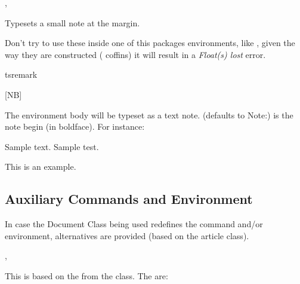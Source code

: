 \documentclass{article}
\begin{document}
\begin{codedescribe}[code]{\typesetmarginnote,\tsmarginnote}
\begin{codesyntax}
\end{codesyntax}
Typesets a small note at the margin. 
\end{codedescribe}

\begin{tsremark}
  Don't try to use these inside one of this packages environments, like , given the way they are constructed ( coffins) it will result in a \emph{Float(s) lost} error.
\end{tsremark}

\begin{codedescribe}[env]{tsremark}
\begin{codesyntax}
\tsmacro{\begin{tsremark}}[NB]{}
\tsmacro{\end{tsremark}}{}
\end{codesyntax}
 The environment body will be typeset as a text note.  (defaults to Note:) is the note begin (in boldface). For instance:
 \begin{codestore}
 Sample text. Sample test.
  \begin{tsremark}[N.B.]
    This is an example. 
  \end{tsremark}
 \end{codestore}
\end{codedescribe}


\newpage

\subsection{Auxiliary Commands and Environment}\label{aux-commands}
In case the Document Class being used redefines the  command and/or  environment, alternatives are provided (based on the article class).

\begin{codedescribe}[code]{\typesettitle,\tstitle}
\begin{codesyntax}
\end{codesyntax}
This is based on the  from the  class. The  are:
\end{codedescribe}
\end{document}
